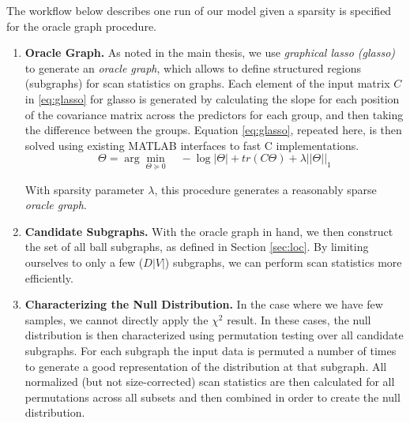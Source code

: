 The workflow below describes one run of our model given a sparsity is specified for the oracle graph procedure.
\begin{enumerate}
\item \textbf{Oracle Graph.} As noted in the main thesis, we use \textit{graphical lasso (glasso)} to generate an \textit{oracle graph}, which allows to define structured regions (subgraphs) for scan statistics on graphs. 
Each element of the input matrix $C$ in \eqref{eq:glasso} for glasso is generated by  calculating the slope for each position of the covariance matrix across the predictors for each group, and then taking the difference between the groups.
Equation \eqref{eq:glasso}, repeated here, is then solved using existing MATLAB interfaces to fast C implementations.
\begin{equation}
\Theta = \arg\min_{\Theta \succeq 0} \quad -\log|\Theta| + tr(C\Theta) + \lambda||\Theta||_{1}
\end{equation}

With sparsity parameter $\lambda$, this procedure generates a reasonably sparse \textit{oracle graph}.

\item \textbf{Candidate Subgraphs.} With the oracle graph in hand, we then construct the set of all ball subgraphs, as defined in Section \ref{sec:loc}. By limiting ourselves to only a few ($D|V|$) subgraphs, we can perform scan statistics more efficiently.

\item \textbf{Characterizing the Null Distribution.} In the case where we have few samples, we cannot directly apply the $\chi^2$ result. In these cases, the null distribution is then characterized using permutation testing over all candidate subgraphs. For each subgraph the input data is permuted a number of times to generate a good representation of the distribution at that subgraph. All normalized (but not size-corrected) scan statistics are then calculated for all permutations across all subsets and then combined in order to create the null distribution.


\end{enumerate}
